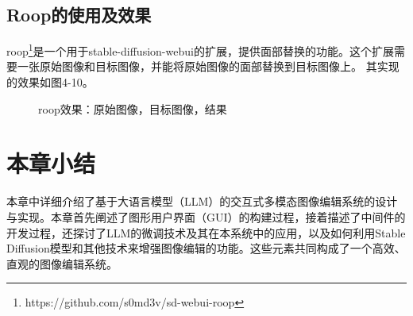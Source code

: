 \documentclass[a4paper,AutoFakeBold,oneside,12pt]{book}
\begin{document}
\subsection{Roop的使用及效果}
roop\footnote{https://github.com/s0md3v/sd-webui-roop}是一个用于stable-diffusion-webui的扩展，提供面部替换的功能。这个扩展需要一张原始图像和目标图像，并能将原始图像的面部替换到目标图像上。
其实现的效果如图4-10。
\begin{figure}[!htbp]
    \centering
    \quad %
    \quad %
    \caption{roop效果：\protect{}原始图像，\protect{}目标图像，\protect{}结果} %
    \label{Fig:Roop} %
\end{figure}

\section{本章小结}
本章中详细介绍了基于大语言模型（LLM）的交互式多模态图像编辑系统的设计与实现。本章首先阐述了图形用户界面（GUI）的构建过程，接着描述了中间件的开发过程，还探讨了LLM的微调技术及其在本系统中的应用，以及如何利用Stable Diffusion模型和其他技术来增强图像编辑的功能。这些元素共同构成了一个高效、直观的图像编辑系统。
\end{document}
